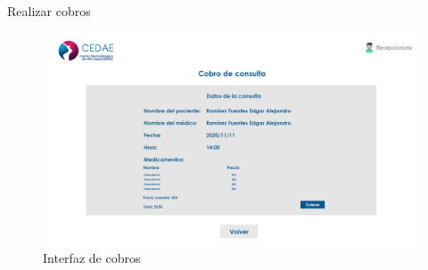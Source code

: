 \documentclass[12pt,letterpaper]{article}
\begin{document}
        Realizar cobros
            \begin{figure}[H]
                \centering
                \includegraphics [scale=0.19]{rec_cobro}
                \caption{Interfaz de cobros}
            \end{figure}
\end{document}
